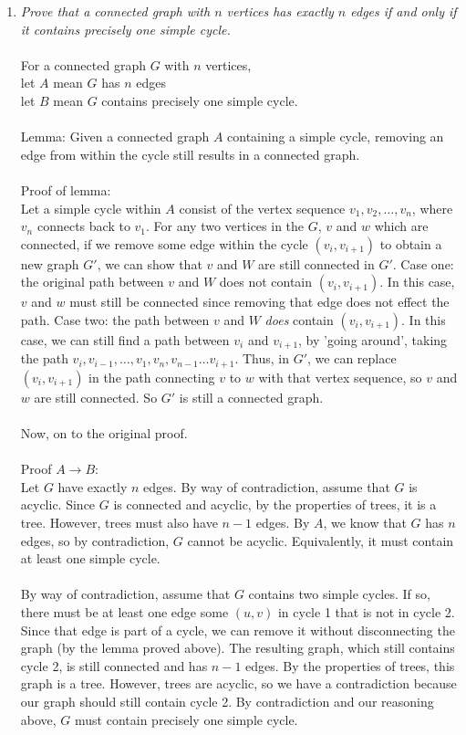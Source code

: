 \documentclass[a4paper]{article}
\begin{document}
\begin{enumerate}
\item \emph{Prove that a connected graph with $n$ vertices has exactly $n$ edges if and only if it contains precisely one simple cycle.} \\
\\
For a connected graph $G$ with $n$ vertices, \\
let $A$ mean $G$ has $n$ edges \\
let $B$ mean $G$ contains precisely one simple cycle. \\
\\
Lemma: Given a connected graph $A$ containing a simple cycle, removing an edge from within the cycle still results in a connected graph. \\
\\
Proof of lemma: \\
Let a simple cycle within $A$ consist of the vertex sequence $v_1,v_2,\dots,v_n$, where $v_n$ connects back to $v_1$. For any two vertices in the $G$, $v$ and $w$ which are connected, if we remove some edge within the cycle $(v_i,v_{i+1})$ to obtain a new graph $G'$, we can show that $v$ and $W$ are still connected in $G'$. Case one: the original path between $v$ and $W$ does not contain $(v_i,v_{i+1})$. In this case, $v$ and $w$ must still be connected since removing that edge does not effect the path. Case two: the path between $v$ and $W$ \emph{does} contain $(v_i,v_{i+1})$. In this case, we can still find a path between $v_i$ and $v_{i+1}$, by 'going around', taking the path $v_i, v_{i-1}, \dots, v_1, v_n, v_{n-1} \dots v_{i+1}$. Thus, in $G'$, we can replace $(v_i,v_{i+1})$ in the path connecting $v$ to $w$ with that vertex sequence, so $v$ and $w$ are still connected. So $G'$ is still a connected graph. \\
\\
Now, on to the original proof. \\
\\
Proof $A\to B$: \\
Let $G$ have exactly $n$ edges. By way of contradiction, assume that $G$ is acyclic. Since $G$ is connected and acyclic, by the properties of trees, it is a tree. However, trees must also have $n-1$ edges. By $A$, we know that $G$ has $n$ edges, so by contradiction, $G$ cannot be acyclic. Equivalently, it must contain at least one simple cycle. \\
\\
By way of contradiction, assume that $G$ contains two simple cycles. If so, there must be at least one edge some $(u,v)$ in cycle 1 that is not in cycle 2. Since that edge is part of a cycle, we can remove it without disconnecting the graph (by the lemma proved above). The resulting graph, which still contains cycle 2, is still connected and has $n-1$ edges. By the properties of trees, this graph is a tree. However, trees are acyclic, so we have a contradiction because our graph should still contain cycle 2. By contradiction and our reasoning above, $G$ must contain precisely one simple cycle. \\

\end{enumerate}
\end{document}
